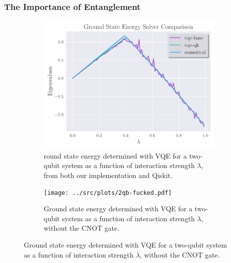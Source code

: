 \documentclass{beamer}
\begin{document}
\begin{frame}[t]
	
\end{frame}
\begin{frame}[t]
	\frametitle{The Importance of Entanglement}

	\begin{figure}[ht]
		\centering
		\begin{subfigure}[b]{0.45\textwidth}
		\begin{center}
			\includegraphics[width=\textwidth]{../src/plots/2qb-all.pdf}
		\end{center}
		\caption{round state energy determined with VQE for a two-qubit system as a function of interaction strength $\lambda$, from both our implementation and Qiskit.}
		\label{fig:2qb-all}
		\end{subfigure}
		\hfill
		\begin{subfigure}[b]{0.45\textwidth}
		\begin{center}
			\texttt{[image: ../src/plots/2qb-fucked.pdf]}	
		\end{center}
		\caption{Ground state energy determined with VQE for a two-qubit system as a function of interaction strength $\lambda$, without the CNOT gate.}
		\label{fig:2-qb-all}
		\end{subfigure}
		\label{fig:2-qb}
	\end{figure}

	
\end{frame}
\end{document}
